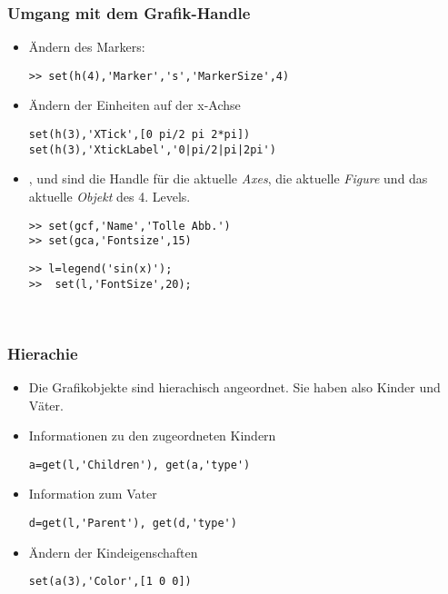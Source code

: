 \begin{frame}[fragile]\frametitle{Umgang mit dem Grafik-Handle }
\begin{itemize}
\item \"Andern des Markers:
\begin{lstlisting}
>> set(h(4),'Marker','s','MarkerSize',4)
\end{lstlisting}
\item \"Andern der Einheiten auf der x-Achse
\begin{lstlisting}
set(h(3),'XTick',[0 pi/2 pi 2*pi])
set(h(3),'XtickLabel','0|pi/2|pi|2pi')
\end{lstlisting}
\item {},  und  sind die Handle f\"ur die
  aktuelle {\it Axes}, die aktuelle {\it Figure} und das aktuelle {\it
  Objekt} des 4. Levels.\\
\begin{minipage}{5cm}

\begin{lstlisting}
>> set(gcf,'Name','Tolle Abb.')
>> set(gca,'Fontsize',15) 
\end{lstlisting}
\end{minipage} \hfill
\begin{minipage}{4cm}
\begin{lstlisting}
>> l=legend('sin(x)');
>>  set(l,'FontSize',20); 
\end{lstlisting}
\end{minipage}\\
\end{itemize}
\end{frame}
%
%
\begin{frame}[fragile]\frametitle{Hierachie}
\begin{itemize}
\item Die Grafikobjekte sind hierachisch angeordnet. Sie haben also Kinder
und V\"ater. 
\item Informationen zu den zugeordneten Kindern
\begin{lstlisting}
a=get(l,'Children'), get(a,'type')
\end{lstlisting}
\item Information zum Vater
\begin{lstlisting}
d=get(l,'Parent'), get(d,'type')
\end{lstlisting}
\item \"Andern der Kindeigenschaften
\begin{lstlisting}
set(a(3),'Color',[1 0 0])
\end{lstlisting}
\end{itemize}
\end{frame}

